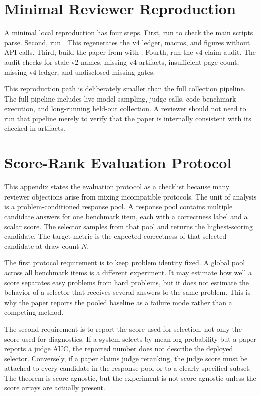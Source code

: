 \section{Minimal Reviewer Reproduction}
\label{app:reviewer-repro}

A minimal local reproduction has four steps. First, run
to check the main scripts parse. Second, run
. This regenerates the v4
ledger, macros, and figures without API calls. Third, build the paper from
 with . Fourth, run the v4 claim
audit. The audit checks for stale v2 names, missing v4 artifacts, insufficient
page count, missing v4 ledger, and undisclosed missing gates.

This reproduction path is deliberately smaller than the full collection
pipeline. The full pipeline includes live model sampling, judge calls, code
benchmark execution, and long-running held-out collection. A reviewer should
not need to run that pipeline merely to verify that the paper is internally
consistent with its checked-in artifacts.

\section{Score-Rank Evaluation Protocol}
\label{app:protocol}

This appendix states the evaluation protocol as a checklist because many
reviewer objections arise from mixing incompatible protocols. The unit of
analysis is a problem-conditioned response pool. A response pool contains
multiple candidate answers for one benchmark item, each with a correctness
label and a scalar score. The selector samples from that pool and returns the
highest-scoring candidate. The target metric is the expected correctness of
that selected candidate at draw count $N$.

The first protocol requirement is to keep problem identity fixed. A global
pool across all benchmark items is a different experiment. It may estimate how
well a score separates easy problems from hard problems, but it does not
estimate the behavior of a selector that receives several answers to the same
problem. This is why the paper reports the pooled baseline as a failure mode
rather than a competing method.

The second requirement is to report the score used for selection, not only the
score used for diagnostics. If a system selects by mean log probability but a
paper reports a judge AUC, the reported number does not describe the deployed
selector. Conversely, if a paper claims judge reranking, the judge score must
be attached to every candidate in the response pool or to a clearly specified
subset. The theorem is score-agnostic, but the experiment is not score-agnostic
unless the score arrays are actually present.

